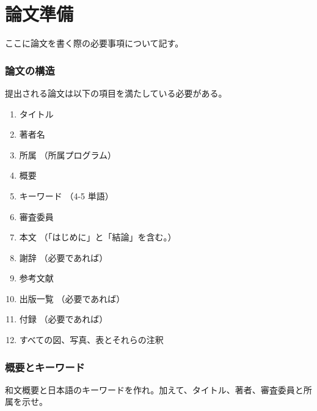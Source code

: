 \chapter{論文準備}
ここに論文を書く際の必要事項について記す。

\subsection{論文の構造}
提出される論文は以下の項目を満たしている必要がある。


\begin{enumerate}
    \item タイトル
    \item 著者名
    \item 所属 （所属プログラム）
    \item 概要
    \item キーワード （4-5 単語） 
    \item 審査委員
    \item 本文 （「はじめに」と「結論」を含む。）
    \item 謝辞 （必要であれば）
    \item 参考文献
    \item 出版一覧 （必要であれば）
    \item 付録 （必要であれば）
    \item すべての図、写真、表とそれらの注釈
\end{enumerate}

\subsection{概要とキーワード}
和文概要と日本語のキーワードを作れ。加えて、タイトル、著者、審査委員と所属を示せ。

